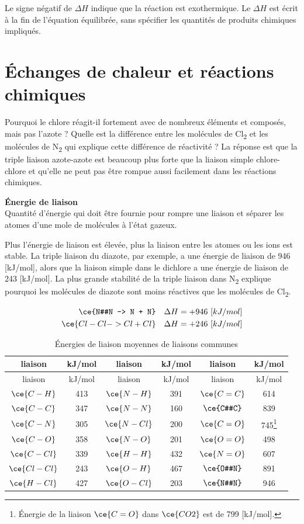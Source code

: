 \documentclass[
  11pt,
  french,
  a4paper,
  openany]{book}
\begin{document}
Le signe négatif de \(\Delta H\) indique que la réaction est exothermique. Le \(\Delta H\) est écrit à la fin de l'équation équilibrée, sans spécifier les quantités de produits chimiques impliqués.

\hypertarget{uxe9changes-de-chaleur-et-ruxe9actions-chimiques}{%
\section{Échanges de chaleur et réactions chimiques}\label{uxe9changes-de-chaleur-et-ruxe9actions-chimiques}}

Pourquoi le chlore réagit-il fortement avec de nombreux éléments et composés, mais pas l'azote ? Quelle est la différence entre les molécules de Cl\textsubscript{2} et les molécules de N\textsubscript{2} qui explique cette différence de réactivité ? La réponse est que la triple liaison azote-azote est beaucoup plus forte que la liaison simple chlore-chlore et qu'elle ne peut pas être rompue aussi facilement dans les réactions chimiques.

\begin{tcolorbox}
\textbf{Énergie de liaison}\\
Quantité d'énergie qui doit être fournie pour rompre une liaison et séparer les atomes d'une mole de molécules à l'état gazeux.

\end{tcolorbox}

Plus l'énergie de liaison est élevée, plus la liaison entre les atomes ou les ions est stable. La triple liaison du diazote, par exemple, a une énergie de liaison de 946 {[}kJ/mol{]}, alors que la liaison simple dans le dichlore a une énergie de liaison de 243 {[}kJ/mol{]}. La plus grande stabilité de la triple liaison dans N\textsubscript{2} explique pourquoi les molécules de diazote sont moins réactives que les molécules de Cl\textsubscript{2}.

\[
\begin{split}
\ce{N#N -> N + N} \quad \Delta H = +946\ [kJ/mol] \\ 
\ce{Cl-Cl -> Cl + Cl} \quad \Delta H = +246\ [kJ/mol]
\end{split}
\]

\begin{longtable}[]{@{}cccccc@{}}
\caption{\label{tab:tab-energie-liaison} Énergies de liaison moyennes de liaisons communes}\tabularnewline
\toprule
liaison & kJ/mol & liaison & kJ/mol & liaison & kJ/mol\tabularnewline
\midrule
\endfirsthead
\toprule
liaison & kJ/mol & liaison & kJ/mol & liaison & kJ/mol\tabularnewline
\midrule
\endhead
\(\ce{C-H}\) & 413 & \(\ce{N-H}\) & 391 & \(\ce{C=C}\) & 614\tabularnewline
\(\ce{C-C}\) & 347 & \(\ce{N-N}\) & 160 & \(\ce{C#C}\) & 839\tabularnewline
\(\ce{C-N}\) & 305 & \(\ce{N-Cl}\) & 200 & \(\ce{C=O}\) & 745\footnote{Énergie de la liaison \(\ce{C=O}\) dans \(\ce{CO2}\) est de 799 {[}kJ/mol{]}.}\tabularnewline
\(\ce{C-O}\) & 358 & \(\ce{N-O}\) & 201 & \(\ce{O=O}\) & 498\tabularnewline
\(\ce{C-Cl}\) & 339 & \(\ce{H-H}\) & 432 & \(\ce{N=O}\) & 607\tabularnewline
\(\ce{Cl-Cl}\) & 243 & \(\ce{O-H}\) & 467 & \(\ce{O#N}\) & 891\tabularnewline
\(\ce{H-Cl}\) & 427 & \(\ce{O-Cl}\) & 203 & \(\ce{N#N}\) & 946\tabularnewline
\bottomrule
\end{longtable}
\end{document}
